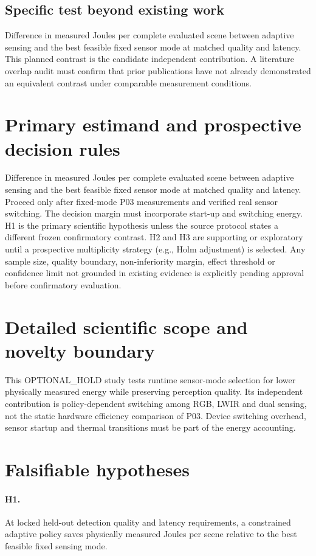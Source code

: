 \documentclass[11pt,a4paper]{article}
\begin{document}
\subsection{Specific test beyond existing work}
Difference in measured Joules per complete evaluated scene between adaptive sensing and the best feasible fixed sensor mode at matched quality and latency. This planned contrast is the candidate independent contribution. A literature overlap audit must confirm that prior publications have not already demonstrated an equivalent contrast under comparable measurement conditions.

\section{Primary estimand and prospective decision rules}
Difference in measured Joules per complete evaluated scene between adaptive sensing and the best feasible fixed sensor mode at matched quality and latency. Proceed only after fixed-mode P03 measurements and verified real sensor switching. The decision margin must incorporate start-up and switching energy. H1 is the primary scientific hypothesis unless the source protocol states a different frozen confirmatory contrast. H2 and H3 are supporting or exploratory until a prospective multiplicity strategy (e.g., Holm adjustment) is selected. Any sample size, quality boundary, non-inferiority margin, effect threshold or confidence limit not grounded in existing evidence is explicitly pending approval before confirmatory evaluation.

\section{Detailed scientific scope and novelty boundary}
This OPTIONAL\_HOLD study tests runtime sensor-mode selection for lower physically measured energy while preserving perception quality. Its independent contribution is policy-dependent switching among RGB, LWIR and dual sensing, not the static hardware efficiency comparison of P03. Device switching overhead, sensor startup and thermal transitions must be part of the energy accounting.

\section{Falsifiable hypotheses}
\paragraph{H1.} At locked held-out detection quality and latency requirements, a constrained adaptive policy saves physically measured Joules per scene relative to the best feasible fixed sensing mode.
\end{document}
